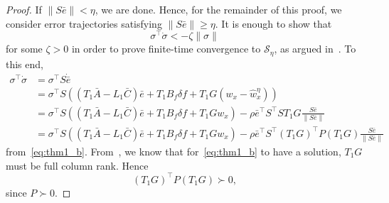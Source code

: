\documentclass[times, doublespace]{rncauth}
\begin{document}
\begin{proof}
	If $\|S\bar e\|<\eta$, we are done. Hence, for the remainder of this proof, we consider error trajectories satisfying $\|S\bar e\|\ge \eta$. It is enough to show that $$\sigma^\top \dot\sigma < -\zeta\|\sigma\|$$ for some $\zeta>0$ in order to prove finite-time convergence to $\mathcal{S}_\eta$, as argued in~\cite{Slotine1991}. To this end,
	\begin{align*}
	\sigma^\top \dot \sigma &= \sigma^\top S \dot{\bar e}\\
	&= \sigma^\top S\left((T_1 \bar A -L_1\bar C) \bar e + T_1 B_f \delta f + T_1G (w_x-\hat w^\eta_x)\right)\\
	&= \sigma^\top S\left((T_1 \bar A -L_1\bar C) \bar e + T_1 B_f \delta f + T_1G w_x\right)-\rho \bar e^\top S^\top S T_1 G \frac{S \bar e}{\|S\bar e\|}\\
	&=\sigma^\top S\left((T_1 \bar A -L_1\bar C) \bar e + T_1 B_f \delta f + T_1G w_x\right)-\rho \bar e^\top S^\top (T_1 G)^\top P (T_1 G) \frac{S \bar e}{\|S\bar e\|}
	\end{align*}
	from~\eqref{eq:thm1_b}. From~\cite{Zhu2014}, we know that for~\eqref{eq:thm1_b} to have a solution, $T_1 G$ must be full column rank. Hence 
	\begin{equation}
	\label{eq:inv_T1GS}
	(T_1 G)^\top P (T_1 G)\succ 0,
	\end{equation} 
	since $P\succ 0$.
	

\end{proof}
\end{document}
